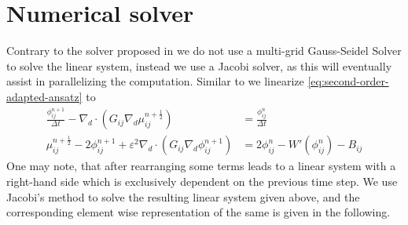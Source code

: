 \documentclass{mimosis}
\begin{document}
\chapter{Numerical solver}
\label{sec:org1ac2f56}
Contrary to the solver proposed in \autocite{Ulmer_CHRelaxed_2024} we do not use a multi-grid Gauss-Seidel Solver to solve the linear system, instead we use a Jacobi solver, as this will eventually assist in parallelizing the computation.
Similar to \autocite{Ulmer_CHRelaxed_2024} we linearize \eqref{eq:second-order-adapted-ansatz} to
\begin{equation}
\begin{aligned}
\frac{\phi_{ij}^{n+1}}{\Delta t}  -  \nabla _d \cdot (G_{ij} \nabla_d \mu_{ij}^{n+\frac{1}{2}} ) &= \frac{ \phi_{ij}^n}{\Delta t}  \\
 \mu_{ij}^{n+\frac{1}{2}} - 2\phi_{ij}^{n+1} + \varepsilon^2  \nabla_d \cdot  (G_{ij} \nabla _d \phi_{ij}^{n+1} ) &=2\phi _{ij}^n - W'(\phi_{ij}^n)  - B_{ij}
\end{aligned}
\end{equation}
One may note, that after rearranging some terms leads to a linear system with a right-hand side which is exclusively dependent on the previous time step.
We use Jacobi's method to solve the resulting linear system given above, and the corresponding element wise representation of the same is given in the following.
\end{document}
